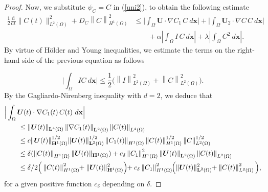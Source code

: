 \documentclass[10pt,number,preprint,times]{elsarticle}
\numberwithin{equation}{section} %
\begin{document}
\begin{proof}
		Now, we substitute $\psi_C=C$ in (\ref{uni2}), to obtain the
		following estimate   
		$$
		\begin{array}{rl}
			\displaystyle \frac{1}{2}\frac{\mathrm{d}}{\mathrm{d} t}\|C(t)\|_{L^2(\Omega)}^{2}+D_C\left\|C\right\|_{H^{1}(\Omega)}^{2}&\leq \displaystyle \Big|\int_{\Omega}\boldsymbol{U}\cdot\nabla C_1 \,C~d{\mathbf{x}}\Big| +\Big|\int_{\Omega} \boldsymbol{U}_{2} \cdot\nabla C\, C~d{\mathbf{x}}\Big| \\&\displaystyle\qquad+\alpha\left| \int_{\Omega} I\, C~d{\mathbf{x}} \right|+\lambda\left|\int_{\Omega} C^2~d{\mathbf{x}} \right|.
		\end{array}
		$$
		By virtue of  H{\"o}lder and Young inequalities, we estimate the terms on the right-hand side of the previous equation as follows
		
		\begin{equation}\label{C1-C2}
			\Big|\int_{\Omega} I C ~d{\mathbf{x}} \Big| \leq \frac{1}{2}\Big(\left\|I\right\|_{L^{2}(\Omega)}^{2}+\left\|C\right\|_{L^{2}(\Omega)}^{2}\Big).
		\end{equation}
		By the Gagliardo-Nirenberg inequality with $d=2$, we deduce that
		\begin{equation}
			\begin{aligned}
				&\Big|\int_{\Omega}\boldsymbol{U}(t)\cdot\nabla C_1(t) \,C(t)~d{\mathbf{x}}\Big|
				\\ &\qquad \leq
				\|\boldsymbol{U}(t)\|_{\mathbf{L}^{4}(\Omega)}\left\|\nabla C_1(t)\right\|_{\mathbf{L}^{2}(\Omega)}\left\|C(t)\right\|_{L^{4}(\Omega)} 
				\\ &\qquad  \leq
				c\|\boldsymbol{U}(t)\|_{\mathbf{H}^{1}(\Omega)}^{1/2}\|\boldsymbol{U}(t)\|_{\mathbf{L}^{2}(\Omega)}^{1/2}\left\|C_1(t)\right\|_{H^{1}(\Omega)}^{}\left\|C(t)\right\|_{H^{1}(\Omega)}^{1/2}\left\|C\right\|_{L^{2}(\Omega)}^{1/2}
				\\ &\qquad  \leq
				\delta(\left\|C(t)\right\|_{H^{1}(\Omega)}^{}\|\boldsymbol{U}(t)\|_{\mathbf{H}^{1}(\Omega)})+c_{\delta}\left\|C_1\right\|_{H^{1}(\Omega)}^{2}\|\boldsymbol{U}(t)\|_{\mathbf{L}^{2}(\Omega)}^{}\left\|C(t)\right\|_{L^2(\Omega)}
				\\ &\qquad \leq
				\delta/2\Big(\left\|C(t)\right\|_{H^{1}(\Omega)}^{2}\hspace*{-0.1 cm}+\|\boldsymbol{U}(t)\|_{\mathbf{H}^{1}(\Omega)}^{2}\Big)\hspace*{-0.1 cm}+c_{\delta}\left\|C_1\right\|_{H^{1}(\Omega)}^{2}\hspace*{-0.1 cm}\Big(\|\boldsymbol{U}(t)\|_{\mathbf{L}^{2}(\Omega)}^{2}\hspace*{-0.1 cm}+\left\|C(t)\right\|_{L^2(\Omega)}^2\Big),
			\end{aligned}
		\end{equation}
	for a given positive function $c_{\delta}$ depending on $\delta$.
	

\end{proof}
\end{document}
